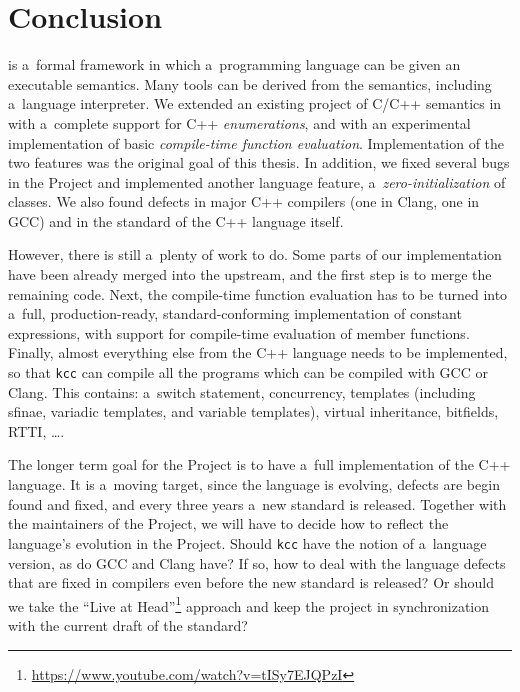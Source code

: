 \documentclass[nolot,nolof,nocover,printed]{fithesis3}
\newcommand{\kcc}{\texttt{kcc}\xspace}
\begin{document}

\chapter{Conclusion}

\K is a~formal framework in which a~programming language can be given an executable semantics. Many tools can be derived from the semantics, including a~language interpreter. We extended an existing project of C/C++ semantics in \K with a~complete support for C++ \textit{enumerations}, and with an experimental implementation of basic \textit{compile-time function evaluation}. Implementation of the two features was the original goal of this thesis. In addition, we fixed several bugs in the Project and implemented another language feature, a~\textit{zero-initialization} of classes. We also found defects in major C++ compilers (one in Clang, one in GCC) and in the standard of the C++ language itself.

However, there is still a~plenty of work to do. Some parts of our implementation have been already merged into the upstream, and the first step is to merge the remaining code. Next, the compile-time function evaluation has to be turned into a~full, production-ready, standard-conforming implementation of constant expressions, with support for compile-time evaluation of member functions. Finally, almost everything else from the C++ language needs to be implemented, so that \kcc can compile all the programs which can be compiled with GCC or Clang. This contains: a~switch statement, concurrency, templates (including sfinae, variadic templates, and variable templates), virtual inheritance, bitfields, RTTI, \ldots .

The longer term goal for the Project is to have a~full implementation of the C++ language. It is a~moving target, since the language is evolving, defects are begin found and fixed, and every three years a~new standard is released. Together with the maintainers of the Project, we will have to decide how to reflect the language's evolution in the Project. Should \kcc have the notion of a~language version, as do GCC and Clang have? If so, how to deal with the language defects that are fixed in compilers even before the new standard is released? Or should we take the \enquote{Live at Head}\footnote{\url{https://www.youtube.com/watch?v=tISy7EJQPzI}} approach and keep the project in synchronization with the current draft of the standard?
\end{document}
